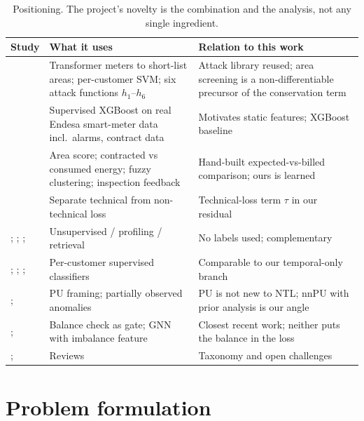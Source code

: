 \documentclass[11pt,a4paper]{article}
\theoremstyle{plain}
\theoremstyle{definition}
\theoremstyle{remark}
\begin{document}
\begin{table}[htbp]
\centering\small
\begin{tabular}{@{}p{4.3cm}p{5.0cm}p{5.6cm}@{}}
\toprule
Study & What it uses & Relation to this work\\
\midrule
\citet{jokar2016} & Transformer meters to short-list areas; per-customer SVM; six attack functions $h_1$--$h_6$ & Attack library reused; area screening is a non-differentiable precursor of the conservation term\\
\citet{buzau2019} & Supervised XGBoost on real Endesa smart-meter data incl.\ alarms, contract data & Motivates static features; XGBoost baseline\\
\citet{terciyanli2017} & Area score; contracted vs consumed energy; fuzzy clustering; inspection feedback & Hand-built expected-vs-billed comparison; ours is learned\\
\citet{shah2021} & Separate technical from non-technical loss & Technical-loss term $\tau$ in our residual\\
\citet{messinis2018}; \citet{sharma2020}; \citet{nizar2006}; \citet{esmael2021} & Unsupervised / profiling / retrieval & No labels used; complementary\\
\citet{ghori2020}; \citet{toma2019}; \citet{chatterjee2017}; \citet{iftikhar2024} & Per-customer supervised classifiers & Comparable to our temporal-only branch\\
\citet{hu2024fcm}; \citet{chen2024partial} & PU framing; partially observed anomalies & PU is not new to NTL; nnPU with prior analysis is our angle\\
\citet{collier2025}; \citet{oguntola2026} & Balance check as gate; GNN with imbalance feature & Closest recent work; neither puts the balance in the loss\\
\citet{morgoev2026review}; \citet{ozcanli2020} & Reviews & Taxonomy and open challenges\\
\bottomrule
\end{tabular}
\caption{Positioning. The project's novelty is the combination and the analysis, not any single ingredient.}
\label{tab:position}
\end{table}

\section{Problem formulation}
\label{sec:formulation}
\end{document}
